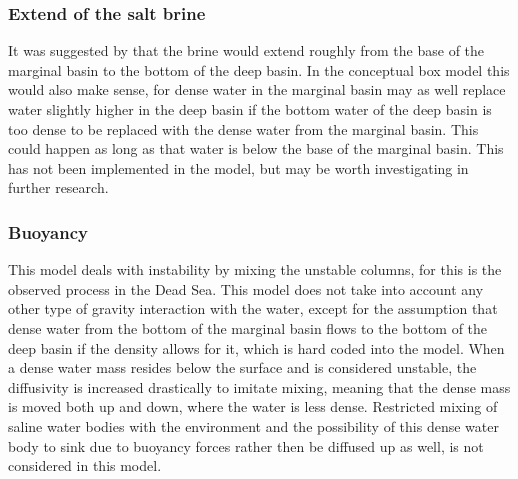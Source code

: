 \documentclass[twocolumn]{article}
\begin{document}






\subsubsection{Extend of the salt brine}
It was suggested by \cite{garcia2018geochemical} that the brine would extend roughly from the base of the marginal basin to the bottom of the deep basin. In the conceptual box model this would also make sense, for dense water in the marginal basin may as well replace water slightly higher in the deep basin if the bottom water of the deep basin is too dense to be replaced with the dense water from the marginal basin. This could happen as long as that water is below the base of the marginal basin. This has not been implemented in the model, but may be worth investigating in further research.

\subsubsection{Buoyancy}
This model deals with instability by mixing the unstable columns, for this is the observed process in the Dead Sea. This model does not take into account any other type of gravity interaction with the water, except for the assumption that dense water from the bottom of the marginal basin flows to the bottom of the deep basin if the density allows for it, which is hard coded into the model. When a dense water mass resides below the surface and is considered unstable, the diffusivity is increased drastically to imitate mixing, meaning that the dense mass is moved both up and down, where the water is less dense. Restricted mixing of saline water bodies with the environment and the possibility of this dense water body to sink due to buoyancy forces rather then be diffused up as well, is not considered in this model.
\end{document}
